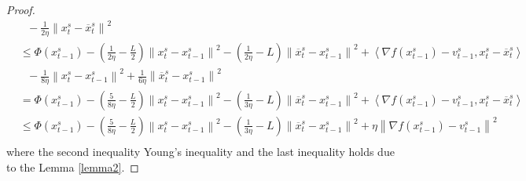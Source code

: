 \documentclass{article}
\newcommand{\norm}[1]{\left\lVert#1\right\rVert}
\newcommand{\Iprod}[2]{\left\langle #1,#2\right\rangle}
\theoremstyle{definition}
\theoremstyle{remark}
\begin{document}
\begin{proof}
\begin{equation}
\begin{split}
 &\,\,\,\, -\frac{1}{2\eta} \norm{x_t^s-\overline{x}_{t}^s}^2\\
 & \leq \Phi({x}_{t-1}^s)  -(\frac{1}{2\eta} - \frac{L}{2})\norm{{x}_t^s-x_{t-1}^s}^2- \left(\frac{1}{2\eta}-L\right)\norm{\overline{x}_t^s-x_{t-1}^s}^2+\Iprod{\nabla f(x_{t-1}^s)-v_{t-1}^s}{x_t^s - \overline{x}_t^s}\\
 &\,\,\,\, -\frac{1}{8\eta} \norm{x_t^s-{x}_{t-1}^s}^2 + \frac{1}{6\eta} \norm{\overline{x}_{t}^s-{x}_{t-1}^s}^2\\
 & = \Phi({x}_{t-1}^s)  -(\frac{5}{8\eta} - \frac{L}{2})\norm{{x}_t^s-x_{t-1}^s}^2- \left(\frac{1}{3\eta}-L\right)\norm{\overline{x}_t^s-x_{t-1}^s}^2+\Iprod{\nabla f(x_{t-1}^s)-v_{t-1}^s}{x_t^s - \overline{x}_t^s}\\
  & \leq \Phi({x}_{t-1}^s)  -(\frac{5}{8\eta} - \frac{L}{2})\norm{{x}_t^s-x_{t-1}^s}^2- \left(\frac{1}{3\eta}-L\right)\norm{\overline{x}_t^s-x_{t-1}^s}^2+\eta \norm{\nabla f(x_{t-1}^s)-v_{t-1}^s}^2\\
 \end{split}
 \end{equation}
 where the second inequality Young's inequality and the last inequality holds due to the Lemma \ref{lemma2}.
 

\end{proof}
\end{document}

